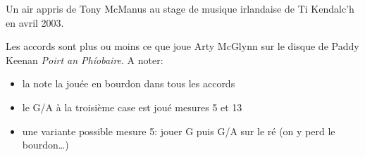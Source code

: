 Un air appris de Tony McManus au stage de musique irlandaise de Ti Kendalc'h
en avril 2003.

\chords{
  \Anotd
  \GMaj
  \GbA
  \AMajva
  \GbAva
}

\tune

Les accords sont plus ou moins ce que joue Arty McGlynn sur le disque de Paddy
Keenan \emph{Poirt an Ph\'iobaire}. A noter:
\begin{itemize}
\item la note la jouée en bourdon dans tous les accords
\item le G/A à la troisième case est joué mesures 5 et 13
\item une variante possible mesure 5: jouer G puis G/A sur le ré (on y perd le
bourdon\ldots)
\end{itemize}
